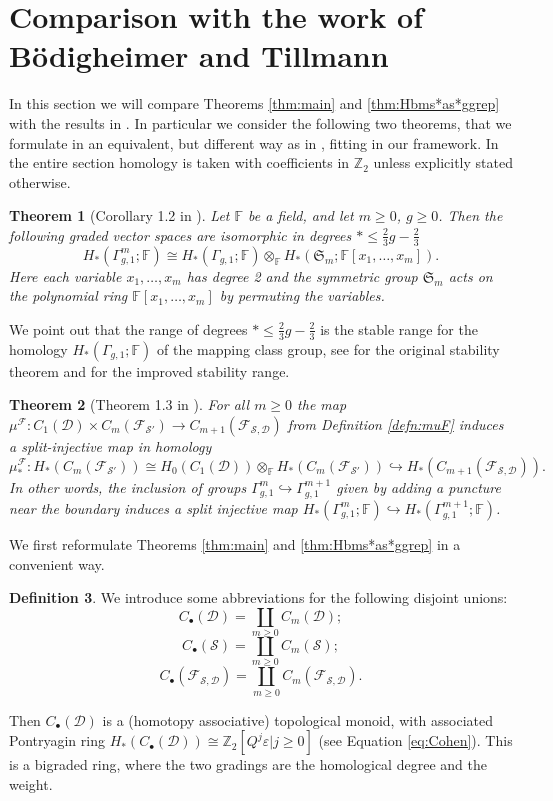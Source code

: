 \documentclass{amsart}
\theoremstyle{plain}
\newtheorem{thm}{Theorem}[section]
\theoremstyle{definition}
\newtheorem{defn}[thm]  {Definition}
\newcommand{\D}{\mathcal{D}}
\newcommand{\F}{\mathbb{F}}
\newcommand{\cF}{\mathcal{F}}
\renewcommand{\S}{\mathcal{S}}
\newcommand{\Z}{\mathbb{Z}}
\renewcommand{\gg}{\Gamma_{g,1}}
\newcommand{\ggm}{\gg^m}
\newcommand{\pa}[1]{\left(#1\right)}
\renewcommand{\epsilon}{\varepsilon}
\begin{document}
\section{Comparison with the work of B\"{o}digheimer and Tillmann}
\label{sec:comparison}
In this section we will compare Theorems \ref{thm:main} and \ref{thm:Hbms*as*ggrep}
with the results in \cite{BoT}. In particular we consider the following two theorems, that
we formulate in an equivalent, but different way as in \cite{BoT}, fitting in our
framework. In the entire section homology is taken with coefficients in $\Z_2$ unless explicitly
stated otherwise.
\begin{thm}[Corollary 1.2 in \cite{BoT}]
\label{thm:BoTone}
Let $\F$ be a field, and let $m\geq 0$, $g\geq 0$. Then the following graded vector spaces are isomorphic in degrees $*\leq \frac 23 g-\frac 23$
\[
 H_*\pa{\ggm;\F}\cong H_*\pa{\gg;\F}\otimes_{\F} H_*\pa{\mathfrak{S}_m;\F[x_1,\dots,x_m]}.
\]
Here each variable $x_1,\dots,x_m$ has degree 2 and the symmetric group $\mathfrak{S}_m$ acts on the polynomial
ring $\F[x_1,\dots,x_m]$ by permuting the variables.
\end{thm}
We point out that the range of degrees $*\leq \frac 23 g-\frac 23$ is the stable range for the homology $H_*(\gg;\F)$
of the mapping class group, see \cite{Harer} for the original stability theorem and \cite{Boldsen, ORW:resolutions_homstab} for the improved
stability range.
\begin{thm}[Theorem 1.3 in \cite{BoT}]
\label{thm:BoTtwo}
For all $m\geq 0$ the map $\mu^{\cF}\colon C_1(\D)\times C_m(\cF_{\S'})\to C_{m+1}(\cF_{\S,\D})$ from Definition \ref{defn:muF}
induces a split-injective map in homology
\[
 \mu^{\cF}_*\colon H_*\pa{C_m(\cF_{\S'})}\cong H_0\pa{C_1(\D)}\otimes_{\F} H_*\pa{C_m(\cF_{\S'})}\hookrightarrow H_*\pa{C_{m+1}(\cF_{\S,\D})}.
\]
In other words, the inclusion of groups $\ggm\hookrightarrow\gg^{m+1}$ given by adding a puncture near the boundary induces a split
injective map $H_*(\ggm;\F)\hookrightarrow H_*(\gg^{m+1};\F)$.
\end{thm}

We first reformulate Theorems \ref{thm:main} and \ref{thm:Hbms*as*ggrep} in a convenient way.
\begin{defn}
 \label{defn:Cbullet}
 We introduce some abbreviations for the following disjoint unions:
 \[
 C_{\bullet}(\D)=\coprod_{m\geq 0}C_m(\D);
 \]
 \[
 C_{\bullet}(\S)=\coprod_{m\geq 0}C_m(\S); 
 \]
 \[
 C_{\bullet}(\cF_{\S,\D})=\coprod_{m\geq 0}C_m(\cF_{\S,\D}).
 \]
\end{defn}
Then $C_{\bullet}(\D)$ is a (homotopy associative) topological monoid, with associated
Pontryagin ring $H_*\pa{C_{\bullet}(\D)}\cong\Z_2[Q^j\epsilon|j\geq 0]$ (see Equation \ref{eq:Cohen}).
This is a bigraded ring, where the two gradings are the homological degree and the weight.
\end{document}
